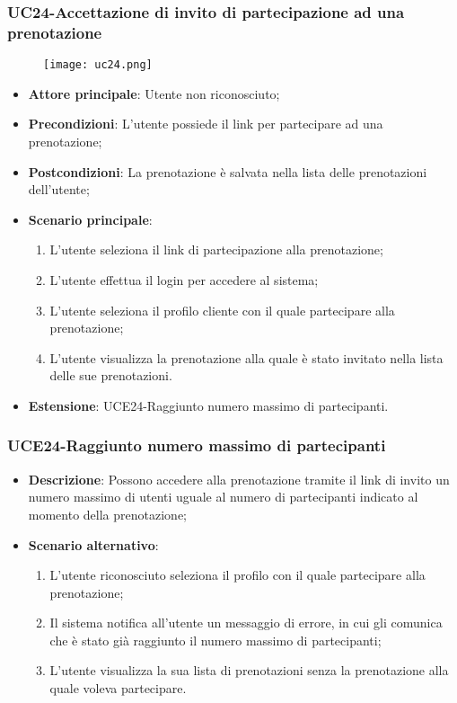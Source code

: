 \pagebreak
\subsubsection{UC24-Accettazione di invito di partecipazione ad una prenotazione}
\begin{figure}[h] \texttt{[image: uc24.png]} \end{figure}

\begin{itemize}
\item \textbf{Attore principale}: Utente non riconosciuto;
\item \textbf{Precondizioni}: L'utente possiede il link per partecipare ad una prenotazione;
\item \textbf{Postcondizioni}: La prenotazione è salvata nella lista delle prenotazioni dell'utente;
\item \textbf{Scenario principale}:
\begin{enumerate}
\item L'utente seleziona il link di partecipazione alla prenotazione;
\item L'utente effettua il login per accedere al sistema;
\item L'utente seleziona il profilo cliente con il quale partecipare alla prenotazione;
\item L'utente visualizza la prenotazione alla quale è stato invitato nella lista delle sue prenotazioni.
\end{enumerate}
\item \textbf{Estensione}: UCE24-Raggiunto numero massimo di partecipanti.
\end{itemize}

\subsubsection{UCE24-Raggiunto numero massimo di partecipanti}

\begin{itemize}
\item \textbf{Descrizione}: Possono accedere alla prenotazione tramite il link di invito un numero massimo di utenti uguale al numero di partecipanti indicato al momento della prenotazione;
\item \textbf{Scenario alternativo}:
\begin{enumerate}
\item L'utente riconosciuto seleziona il profilo con il quale partecipare alla prenotazione;
\item Il sistema notifica all'utente un messaggio di errore, in cui gli comunica che è stato già raggiunto il numero massimo di partecipanti; %
\item L'utente visualizza la sua lista di prenotazioni senza la prenotazione alla quale voleva partecipare.
\end{enumerate}
\end{itemize}

